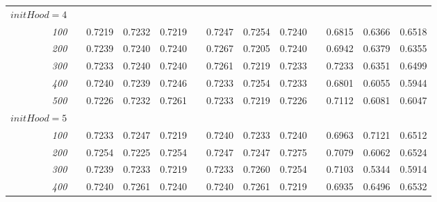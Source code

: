 \documentclass[a4paper, 10pt]{article}
\begin{document}
\begin{figure}[h]
\begin{tabular}{@{}rcrrrcrrrcrrr@{}}
        $initHood = 4$ \\
        \emph{100}  &&  0.7219  &  0.7232  &  0.7219  &&  0.7247  &  0.7254  &  0.7240  &&  0.6815  &  0.6366  &  0.6518 \\
        \emph{200}  &&  0.7239  &  0.7240  &  0.7240  &&  0.7267  &  0.7205  &  0.7240  &&  0.6942  &  0.6379  &  0.6355 \\
        \emph{300}  &&  0.7233  &  0.7240  &  0.7240  &&  0.7261  &  0.7219  &  0.7233  &&  0.7233  &  0.6351  &  0.6499 \\
        \emph{400}  &&  0.7240  &  0.7239  &  0.7246  &&  0.7233  &  0.7254  &  0.7233  &&  0.6801  &  0.6055  &  0.5944 \\
        \emph{500}  &&  0.7226  &  0.7232  &  0.7261  &&  0.7233  &  0.7219  &  0.7226  &&  0.7112  &  0.6081  &  0.6047 \\
        $initHood = 5$ \\
        \emph{100}  &&  0.7233  &  0.7247  &  0.7219  &&  0.7240  &  0.7233  &  0.7240  &&  0.6963  &  0.7121  &  0.6512 \\
        \emph{200}  &&  0.7254  &  0.7225  &  0.7254  &&  0.7247  &  0.7247  &  0.7275  &&  0.7079  &  0.6062  &  0.6524 \\
        \emph{300}  &&  0.7239  &  0.7233  &  0.7219  &&  0.7233  &  0.7260  &  0.7254  &&  0.7103  &  0.5344  &  0.5914 \\
        \emph{400}  &&  0.7240  &  0.7261  &  0.7240  &&  0.7240  &  0.7261  &  0.7219  &&  0.6935  &  0.6496  &  0.6532 \\

\end{tabular}
\end{figure}
\end{document}
